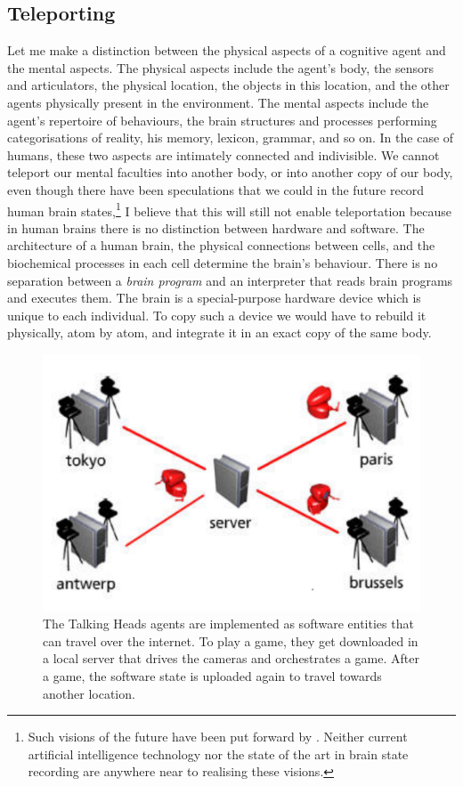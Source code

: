 \subsection{Teleporting}

Let me make a distinction between the physical aspects of 
a cognitive agent and the mental aspects. The physical aspects include the 
agent's body, the sensors and articulators, 
the physical location, the objects in this location, and the other
agents physically present in the environment. The 
mental aspects include the agent's repertoire of behaviours, 
the brain structures and processes
performing categorisations of reality, his
memory, lexicon, grammar, and so on. 
In the case of humans, these two aspects are intimately 
connected and indivisible. We cannot teleport our mental 
faculties into another body, or into another copy of 
our body, even though there have been speculations that 
we could in the future record human 
brain states,\footnote{
Such visions of the future have been put forward
by \cite{Moravec:1995}. Neither current artificial intelligence technology nor
the state of the art in brain state recording are anywhere 
near to realising these visions.}
I believe that this will still not enable teleportation
because in human brains there is no distinction between 
hardware and software. The architecture of a human brain, 
the physical connections between cells, and the 
biochemical processes in each cell determine the brain's behaviour.
There is no separation between a {\it brain program} and
an interpreter that reads brain programs and 
executes them. The brain is a special-purpose 
hardware device which is unique to each individual. 
To copy such a device we would have to rebuild it physically,
atom by atom, and integrate it in an exact copy of the 
same body. 


\begin{figure}[htbp]
  \centerline{\includegraphics[width=.50\textwidth]{chap1/figs/teleportation}}
\caption{ The Talking Heads agents are implemented as software entities that can travel over the internet. 
To play a game, they get downloaded in a local server that drives the cameras and orchestrates a game. After a game, the software 
state is uploaded again to travel towards another location.}
\label{f:teleport}
\end{figure}

